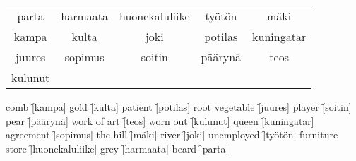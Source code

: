 \begin{center}
  \begin{tabular}{|c c c c c|}
    \hline
    parta & harmaata & huonekaluliike & työtön & mäki \\
    kampa & kulta & joki & potilas & kuningatar \\
    juures & sopimus & soitin & päärynä & teos \\
    kulunut &&&&\\
    \hline
  \end{tabular}
\end{center}

\begin{questions}
  \begin{multicols}{3}
    \raggedcolumns
    \question comb \f[kampa]
    \question gold \f[kulta]
    \question patient \f[potilas]
    \question root vegetable \f[juures]
    \question player \f[soitin]
    \question pear \f[päärynä]
    \question work of art \f[teos]
    \question worn out \f[kulunut]
    \question queen \f[kuningatar]
    \question agreement \f[sopimus]
    \question the hill \f[mäki]
    \question river \f[joki]
    \question unemployed \f[työtön]
    \question furniture store \f[huonekaluliike]
    \question grey  \f[harmaata]
    \question beard \f[parta]
  \end{multicols}
\end{questions}
